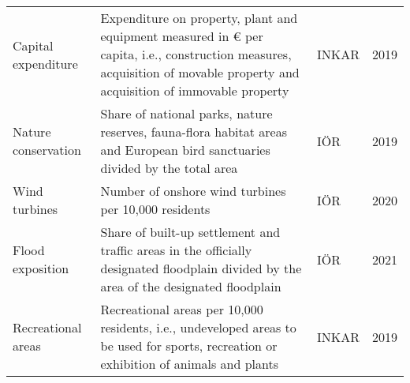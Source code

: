 \begin{table}
\begin{minipage}{\textwidth}
\begin{tabularx}{\textwidth}{lXll}
Capital expenditure & Expenditure on property, plant and equipment measured in € per capita, i.e., construction measures, acquisition of movable property and acquisition of immovable property & INKAR & 2019\\
Nature conservation & Share of national parks, nature reserves, fauna-flora habitat areas and European bird sanctuaries divided by the total area & IÖR & 2019\\
Wind turbines & Number of onshore wind turbines per 10,000 residents & IÖR & 2020\\
Flood exposition & Share of built-up settlement and traffic areas in the officially designated floodplain divided by the area of the designated floodplain & IÖR & 2021\\
\addlinespace
Recreational areas & Recreational areas per 10,000 residents, i.e., undeveloped areas to be used for sports, recreation or exhibition of animals and plants & INKAR & 2019\\
\bottomrule
\end{tabularx}
\end{minipage}
\end{table}